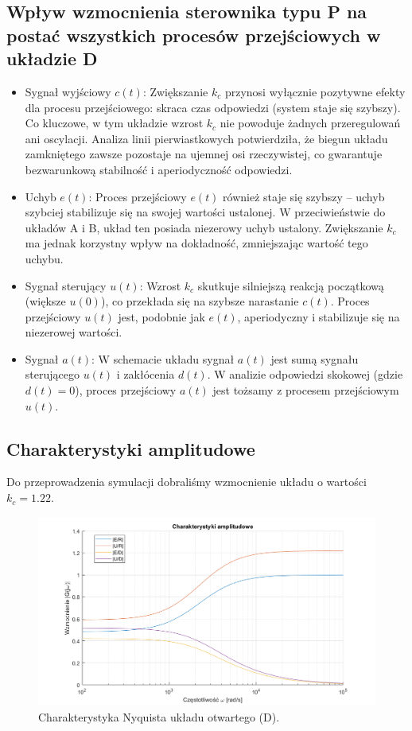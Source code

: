 \documentclass[12pt,a4paper]{article}
\begin{document}
	\subsection{Wpływ wzmocnienia sterownika typu P na postać wszystkich procesów przejściowych w układzie D}
	\begin{itemize}
		\item Sygnał wyjściowy $c(t)$: Zwiększanie $k_c$ przynosi wyłącznie pozytywne efekty dla procesu przejściowego: skraca czas odpowiedzi (system staje się szybszy). Co kluczowe, w tym układzie wzrost $k_c$ nie powoduje żadnych przeregulowań ani oscylacji. Analiza linii pierwiastkowych potwierdziła, że biegun układu zamkniętego zawsze pozostaje na ujemnej osi rzeczywistej, co gwarantuje bezwarunkową stabilność i aperiodyczność odpowiedzi.
		\item Uchyb $e(t)$: Proces przejściowy $e(t)$ również staje się szybszy – uchyb szybciej stabilizuje się na swojej wartości ustalonej. W przeciwieństwie do układów A i B, układ ten posiada niezerowy uchyb ustalony. Zwiększanie $k_c$ ma jednak korzystny wpływ na dokładność, zmniejszając wartość tego uchybu.
		\item Sygnał sterujący $u(t)$: Wzrost $k_c$ skutkuje silniejszą reakcją początkową (większe $u(0)$), co przekłada się na szybsze narastanie $c(t)$. Proces przejściowy $u(t)$ jest, podobnie jak $e(t)$, aperiodyczny i stabilizuje się na niezerowej wartości.
		\item Sygnał $a(t)$: W schemacie układu sygnał $a(t)$ jest sumą sygnału sterującego $u(t)$ i zakłócenia $d(t)$. W analizie odpowiedzi skokowej (gdzie $d(t)=0$), proces przejściowy $a(t)$ jest tożsamy z procesem przejściowym $u(t)$.
	\end{itemize}
	
	\subsection{Charakterystyki amplitudowe}
		
		Do przeprowadzenia symulacji dobraliśmy wzmocnienie układu o wartości $k_c = 1.22$.
				
		\begin{figure}[H]
			\centering
			\includegraphics[width=0.8\linewidth]{zdjecia/char_czest_ukladu_D.png}
			\caption{Charakterystyka Nyquista układu otwartego (D).}
			\label{fig:char_czest_ukladu_D}
		\end{figure}
		
\end{document}
